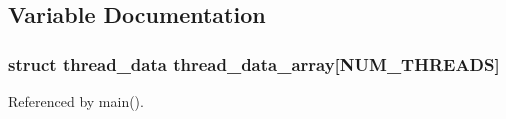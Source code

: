 \subsection{Variable Documentation}
\subsubsection[{thread\_\-data\_\-array}]{\setlength{\rightskip}{0pt plus 5cm}struct {\bf thread\_\-data} {\bf thread\_\-data\_\-array}[NUM\_\-THREADS]}\label{saruman_8c_06b5e9cc2498aeb53679fd0fe27bcdeb}




Referenced by main().